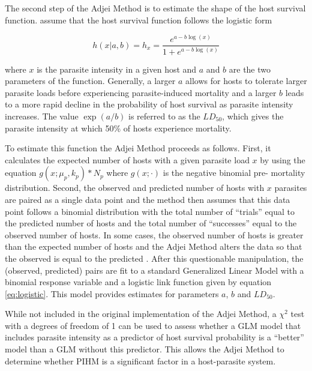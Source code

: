 \documentclass[12pt, a4paper]{article}
\begin{document}
The second step of the Adjei Method is to estimate the shape of the host survival function. \cite{Adjei1986} assume that the host survival function follows the logistic form

\begin{equation}
    h(x | a, b) = h_x = \dfrac{e^{a - b \log(x)}}{1 + e^{a - b \log(x)}}
    \label{eq:logistic}
\end{equation}

where $x$ is the parasite intensity in a given host and $a$ and $b$ are the two
parameters of the function. Generally, a larger $a$ allows for hosts to
tolerate larger parasite loads before experiencing parasite-induced mortality
and a larger $b$ leads to a more rapid decline in the probability of host
survival as parasite intensity increases.  The value $\exp(a / b)$ is referred
to as the $LD_{50}$, which gives the parasite intensity at which 50\% of hosts
experience mortality.

To estimate this function the Adjei Method proceeds as follows.  First, it
calculates the expected number of hosts with a given parasite load $x$ by using
the equation $g(x ; \mu_p, k_p) * N_p$ where $g(x ; \cdot)$ is the negative binomial pre-
mortality distribution.  Second, the observed and predicted number of hosts
with $x$ parasites are paired as a single data point and the method then assumes that
this data point follows a binomial distribution with the total number of
``trials'' equal to the predicted number of hosts and the total number of
``successes'' equal to the observed number of hosts. In some cases, the
observed number of hosts is greater than the expected number of hosts and the
Adjei Method alters the data so that the observed is equal to the predicted
\citep{Adjei1986}.  After this questionable manipulation, the (observed, predicted) pairs are fit to a standard Generalized Linear Model \citep{McCullagh1989} with a binomial response variable and a logistic link function given by equation \ref{eq:logistic}.  This model provides estimates for parameters $a$, $b$ and $LD_{50}$.

While not included in the original implementation of the Adjei Method, a
$\chi^2$ test with a degrees of freedom of 1 can be used to assess whether a GLM model that includes parasite
intensity as a predictor of host survival probability is a ``better'' model than a
GLM without this predictor.  This allows the Adjei Method to determine whether
PIHM is a significant factor in a host-parasite system.
\end{document}
